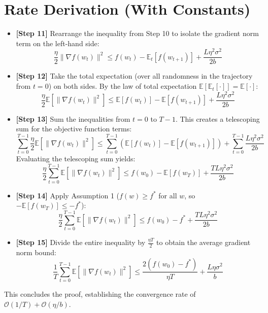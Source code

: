 \documentclass{article}
\begin{document}
\section*{Rate Derivation (With Constants)}

\begin{itemize}
    \item \textbf{[Step 11]} Rearrange the inequality from Step 10 to isolate the gradient norm term on the left-hand side:
    \begin{equation}
        \frac{\eta}{2} \|\nabla f(w_t)\|^2 \leq f(w_t) - \mathbb{E}_t[f(w_{t+1})] + \frac{L \eta^2 \sigma^2}{2b}
    \end{equation}
    
    \item \textbf{[Step 12]} Take the total expectation (over all randomness in the trajectory from $t=0$) on both sides. By the law of total expectation $\mathbb{E}[\mathbb{E}_t[\cdot]] = \mathbb{E}[\cdot]$:
    \begin{equation}
        \frac{\eta}{2} \mathbb{E}[\|\nabla f(w_t)\|^2] \leq \mathbb{E}[f(w_t)] - \mathbb{E}[f(w_{t+1})] + \frac{L \eta^2 \sigma^2}{2b}
    \end{equation}
    
    \item \textbf{[Step 13]} Sum the inequalities from $t = 0$ to $T - 1$. This creates a telescoping sum for the objective function terms:
    \begin{equation}
        \sum_{t=0}^{T-1} \frac{\eta}{2} \mathbb{E}[\|\nabla f(w_t)\|^2] \leq \sum_{t=0}^{T-1} \left( \mathbb{E}[f(w_t)] - \mathbb{E}[f(w_{t+1})] \right) + \sum_{t=0}^{T-1} \frac{L \eta^2 \sigma^2}{2b}
    \end{equation}
    Evaluating the telescoping sum yields:
    \begin{equation}
        \frac{\eta}{2} \sum_{t=0}^{T-1} \mathbb{E}[\|\nabla f(w_t)\|^2] \leq f(w_0) - \mathbb{E}[f(w_T)] + \frac{T L \eta^2 \sigma^2}{2b}
    \end{equation}
    
    \item \textbf{[Step 14]} Apply Assumption 1 ($f(w) \geq f^*$ for all $w$, so $-\mathbb{E}[f(w_T)] \leq -f^*$):
    \begin{equation}
        \frac{\eta}{2} \sum_{t=0}^{T-1} \mathbb{E}[\|\nabla f(w_t)\|^2] \leq f(w_0) - f^* + \frac{T L \eta^2 \sigma^2}{2b}
    \end{equation}
    
    \item \textbf{[Step 15]} Divide the entire inequality by $\frac{\eta T}{2}$ to obtain the average gradient norm bound:
    \begin{equation}
        \frac{1}{T} \sum_{t=0}^{T-1} \mathbb{E}[\|\nabla f(w_t)\|^2] \leq \frac{2(f(w_0) - f^*)}{\eta T} + \frac{L \eta \sigma^2}{b}
    \end{equation}
\end{itemize}
This concludes the proof, establishing the convergence rate of $\mathcal{O}(1/T) + \mathcal{O}(\eta/b)$.
\end{document}
